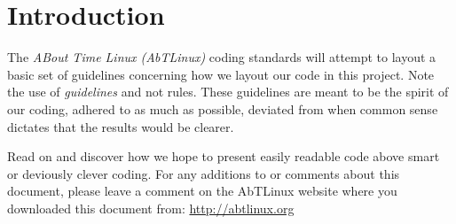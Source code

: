 \section{Introduction}  
The \emph{ABout Time Linux (AbTLinux)} coding standards will attempt to layout
a basic set of guidelines concerning how we layout our code in this project.
Note the use of \emph{guidelines} and not rules. These guidelines are meant to
be the spirit of our coding, adhered to as much as possible, deviated from
when common sense dictates that the results would be clearer.

Read on and discover how we hope to present easily readable code above smart
or deviously clever coding. For any additions to or comments about this
document, please leave a comment on the AbTLinux website where you downloaded
this document from: \url{http://abtlinux.org}

